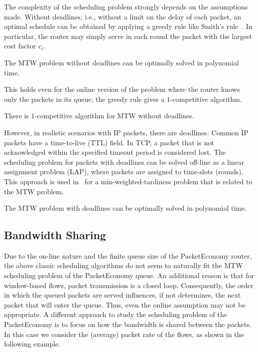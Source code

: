 \documentclass[letterpaper,10pt]{llncs}
\newcommand{\hla}[1]{\hl{#1}}
\renewcommand{\hla}[1]{#1}
\begin{document}
\noindent
The complexity of the scheduling problem strongly depends on the assumptions made. 
Without deadlines, i.e., without a limit on the delay of each packet, 
an optimal schedule can be obtained by applying a greedy rule like Smith's rule~\cite{Smith:1956:Rule}. In particular, the router may simply serve in each 
round the packet with the largest cost factor $c_i$. 
\begin{theorem}
The MTW problem without deadlines can be optimally solved in polynomial time.
\end{theorem}

\noindent
This holds even for the online version of the problem where the router knows only
the packets in its queue; the greedy rule gives a $1$-competitive algorithm.
\begin{theorem}
There is $1$-competitive algorithm for MTW without deadlines.
\end{theorem}

\noindent
However, in realistic scenarios with IP packets, there are deadlines. Common IP packets 
have a time-to-live (TTL) field. In TCP, a packet that is not acknowledged within the specified
timeout period is considered lost. The scheduling problem for packets with deadlines
can be solved off-line as a linear assignment problem (LAP), where packets are assigned to time-slots 
(rounds).
This approach is used in~\cite{GLLR79} for a min-weighted-tardiness problem 
that is related to the MTW problem.

\begin{theorem}
The MTW problem with deadlines can be optimally solved in polynomial time.
\end{theorem}

\subsection{Bandwidth Sharing}
Due to the on-line nature and the finite queue size of the PacketEconomy router, 
the above classic scheduling algorithms do not seem to naturally fit the 
MTW scheduling problem of the PacketEconomy queue. An additional reason is that
for window-based flows, packet transmission is a closed loop. 
Consequently, the order in which the queued packets are served influences, if not determines,
the next packet that will enter the queue. Thus, even the online assumption may not be appropriate.
\hla{A different approach to study the scheduling problem of the PacketEconomy is to 
focus on how the bandwidth is shared between the packets.} In this case we consider the 
(average) packet rate of the flows, as shown in the following example.
\end{document}
